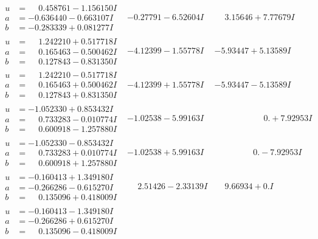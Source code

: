 \documentclass[1p]{elsarticle_modified}
\theoremstyle{definition}
\begin{document}
$$\begin{array}{c|c|c}
\begin{aligned}
u &= \phantom{-}0.458761 - 1.156150 I \\
a &= -0.636440 - 0.663107 I \\
b &= -0.283339 + 0.081277 I\end{aligned}
 & -0.27791 - 6.52604 I & \phantom{-}3.15646 + 7.77679 I \\ \hline\begin{aligned}
u &= \phantom{-}1.242210 + 0.517718 I \\
a &= \phantom{-}0.165463 - 0.500462 I \\
b &= \phantom{-}0.127843 - 0.831350 I\end{aligned}
 & -4.12399 - 1.55778 I & -5.93447 + 5.13589 I \\ \hline\begin{aligned}
u &= \phantom{-}1.242210 - 0.517718 I \\
a &= \phantom{-}0.165463 + 0.500462 I \\
b &= \phantom{-}0.127843 + 0.831350 I\end{aligned}
 & -4.12399 + 1.55778 I & -5.93447 - 5.13589 I \\ \hline\begin{aligned}
u &= -1.052330 + 0.853432 I \\
a &= \phantom{-}0.733283 - 0.010774 I \\
b &= \phantom{-}0.600918 - 1.257880 I\end{aligned}
 & -1.02538 - 5.99163 I & \phantom{-0.000000 -}0. + 7.92953 I \\ \hline\begin{aligned}
u &= -1.052330 - 0.853432 I \\
a &= \phantom{-}0.733283 + 0.010774 I \\
b &= \phantom{-}0.600918 + 1.257880 I\end{aligned}
 & -1.02538 + 5.99163 I & \phantom{-0.000000 } 0. - 7.92953 I \\ \hline\begin{aligned}
u &= -0.160413 + 1.349180 I \\
a &= -0.266286 - 0.615270 I \\
b &= \phantom{-}0.135096 + 0.418009 I\end{aligned}
 & \phantom{-}2.51426 - 2.33139 I & \phantom{-}9.66934 + 0. I\phantom{ +0.000000I} \\ \hline\begin{aligned}
u &= -0.160413 - 1.349180 I \\
a &= -0.266286 + 0.615270 I \\
b &= \phantom{-}0.135096 - 0.418009 I\end{aligned}

\end{array}$$
\end{document}

